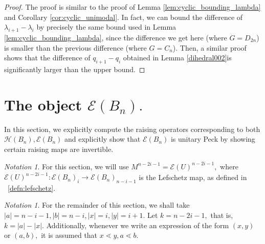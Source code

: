 \documentclass[10 pt]{amsart}
\theoremstyle{plain}
\theoremstyle{definition}
\theoremstyle{remark}
\newtheorem{note}[thm]{Notation}
\numberwithin{equation}{section}
\begin{document}
\begin{proof}
The proof is similar to the proof of Lemma \ref{lem:cyclic_bounding_lambda} and Corollary \ref{cor:cyclic_unimodal}. In fact, we can bound the difference of $\lambda_{i+1} - \lambda_i$ by precisely the same bound used in Lemma \ref{lem:cyclic_bounding_lambda}, since the difference we get here (where $G = D_{2n}$) is smaller than the previous difference (where $G= C_n$). Then, a similar proof shows that the difference of $q_{i+1} - q_i$ obtained in Lemma \ref{dihedral002}is significantly larger than the upper bound.
\end{proof}












\section{The object $\mathcal E(B_n).$}
\label{sec:unitary_peck_f}
In this section, we explicitly compute the raising operators corresponding to both \linebreak $\mathcal H(B_n),\mathcal E(B_n)$ and explicitly show that $\mathcal E(B_n)$ is unitary Peck by showing certain raising maps are invertible.

\begin{note}
For this section, we will use $M^{n-2i-1} = \mathcal E(U)^{n-2i-1},$ where $\mathcal E(U)^{n-2i-1}:\mathcal E(B_n)_i \rightarrow \mathcal E(B_n)_{n-i-1}$ is the Lefschetz map, as defined in ~\ref{defn:lefschetz}.
\end{note}
\begin{note}
For the remainder of this section, we shall take $|a| = n-i-1,|b|= n-i,|x| = i,|y| = i+1.$ Let $k = n-2i-1,$ that is, $k = |a| - |x|.$ Additionally, whenever we write an expression of the form $(x, y)$ or $(a, b),$ it is assumed that $x \lessdot y,a \lessdot b.$
\end{note}
\end{document}
